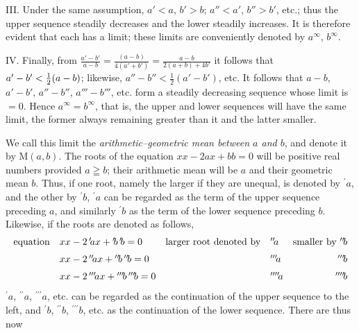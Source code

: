 \par
{}
III. Under the same assumption, $a'<a$, $b'>b$; $a''<a'$, $b''>b'$, etc.; thus the upper
sequence steadily decreases and the lower steadily increases. It is therefore evident
that each has a limit; these limits are conveniently denoted by $a^{\infty}$, $b^{\infty}$.
\par
{}
IV. Finally, from $\frac{a'-b'}{a-b}=\frac{(a-b)}{4(a'+b')}=\frac{a-b}{2(a+b)+4b'}$ it follows that \hfill\\{}
$a'-\nobreak{}b'<\nobreak{}\tfrac12(a-\nobreak{}b)$;
likewise, $a''-b''<\tfrac12(a'-b')$, etc. It follows that $a-b$, $a'-b'$,
$a''-b''$, $a'''-b'''$, etc. form a steadily decreasing sequence whose
limit is $=0$. Hence $a^{\infty}=b^{\infty}$, that is, the upper and lower sequences will have the same
limit, the former always remaining greater than it and the latter smaller.
\par
We call this limit the \textit{arithmetic–geometric mean between $a$ and $b$},
and denote it by $\mathrm{M}(a,b)$.
The roots of the equation $xx-2ax+bb=0$ will be positive real numbers provided
$a\geqq b$; their arithmetic mean will be $a$ and their geometric mean $b$. Thus, if
one root, namely the larger if they are unequal, is denoted by ${}^{\prime}\!a$, and the other by ${}^{\prime}\!b$, ${}^{\prime}\!a$ can be regarded as the term of the upper sequence preceding $a$, and similarly ${}^{\prime}\!b$ as the term of the lower sequence preceding $b$. Likewise, if the roots are denoted as follows,
\begingroup\fontsize{9}{11}\selectfont
\begingroup\setlength{\arraycolsep}{2pt}
\[
\begin{array}{@{}lllll@{}}
\mathrm{equation}&xx-2\,{}^{\prime}\!ax+{}^{\prime}\!b\,{}^{\prime}\!b=0&\mathrm{larger\ root\ denoted\ by}&{}^{\prime\prime}\!a&\mathrm{smaller\ by}\ {}^{\prime\prime}\!b\\[6pt]
&xx-2\,{}^{\prime\prime}\!ax+{}^{\prime\prime}\!b\,{}^{\prime\prime}\!b=0&&{}^{\prime\prime\prime}\!a&\hfill{}^{\prime\prime\prime}\!b\\[6pt]
&xx-2\,{}^{\prime\prime\prime}\!ax+{}^{\prime\prime\prime}\!b\,{}^{\prime\prime\prime}\!b=0&&{}^{\prime\prime\prime\prime}\!a&\hfill{}^{\prime\prime\prime\prime}\!b
\end{array}
\]\endgroup
\endgroup
${}^{\prime}\!a$, ${}^{\prime\prime}\!a$, ${}^{\prime\prime\prime}\!a$, etc. can be regarded as the continuation of the upper sequence to the left, and ${}^{\prime}\!b$, ${}^{\prime\prime}\!b$, ${}^{\prime\prime\prime}\!b$, etc. as the continuation of the lower sequence. There are thus now

